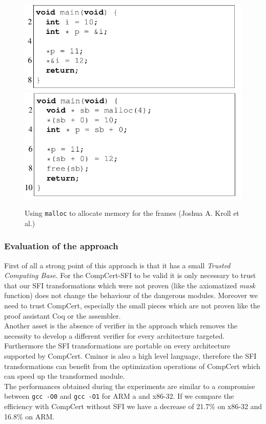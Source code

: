 \documentclass[11pt]{sdm}
\begin{document}
\begin{figure}[!ht]
\centering
\includegraphics[scale=0.33]{images/before_shadow.png}
\includegraphics[scale=0.33]{images/after_shadow.png}
\caption{Using \texttt{malloc} to allocate memory for the frames (Joshua A. Kroll et al.)}
\label{shadow_stack}
\end{figure}

\subsubsection{Evaluation of the approach}
\label{ssub:Evalutation of the approach}
First of all a strong point of this approach is that it has a small \textit{Trusted Computing Base}. For the CompCert-SFI to be valid it is only necessary to trust that our SFI transformations which were not proven (like the axiomatized \textit{mask} function) does not change the behaviour of the dangerous modules. Moreover we need to trust CompCert, especially the small pieces which are not proven like the proof assistant Coq or the assembler. \\
Another asset is the absence of verifier in the approach which removes the necessity to develop a different verifier for every architecture targeted. Furthermore the SFI transformations are portable on every architecture supported by CompCert. Cminor is also a high level language, therefore the SFI transformations can benefit from the optimization operations of CompCert which can speed up the transformed module. \\
The performances obtained during the experiments are similar to a compromise between \texttt{gcc -O0} and \texttt{gcc -O1} for ARM a and x86-32. If we compare the efficiency with CompCert without SFI we have a decrease of 21.7\% on x86-32 and 16.8\% on ARM.
\end{document}
